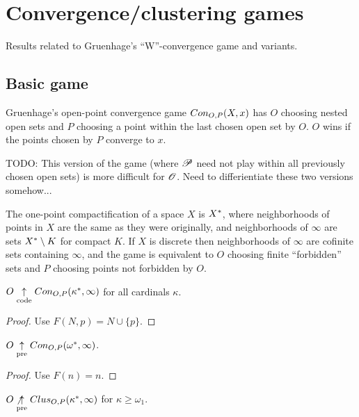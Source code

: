 
\chapter{Convergence/clustering games}

Results related to Gruenhage's ``W''-convergence game and variants.

\section{Basic game}

\begin{defn} 
Gruenhage's open-point convergence game $Con_{O,P}(X,x)$ has $O$ choosing nested open sets and $P$ choosing a point within the last chosen open set by $O$. $O$ wins if the points chosen by $P$ converge to $x$.
\end{defn}

TODO: This version of the game (where $\mathscr{P}$ need not play within all 
previously chosen open sets) is more difficult for $\mathscr{O}$. Need to 
differientiate these two versions somehow...

\begin{defn}
The one-point compactification of a space $X$ is $X^*$, where neighborhoods of points in $X$ are the same as they were originally, and neighborhoods of $\infty$ are sets $X^*\setminus K$ for compact $K$. If $X$ is discrete then neighborhoods of $\infty$ are cofinite sets containing $\infty$, and the game is equivalent to $O$ choosing finite ``forbidden'' sets and $P$ choosing points not forbidden by $O$.
\end{defn}

\begin{prop}
$O\underset{\text{code}}{\uparrow} Con_{O,P}(\kappa^*,\infty)$ for all cardinals $\kappa$.
\end{prop}

\begin{proof}
Use $F(N,p)=N\cup\{p\}$.
\end{proof}

\begin{prop}
$O\underset{\text{pre}}{\uparrow} Con_{O,P}(\omega^*,\infty)$.
\end{prop}

\begin{proof}
Use $F(n)=n$.
\end{proof}


\begin{prop}
$O\not\underset{\text{pre}}{\uparrow} Clus_{O,P}(\kappa^*,\infty)$ for $\kappa\geq\omega_1$.
\end{prop}

